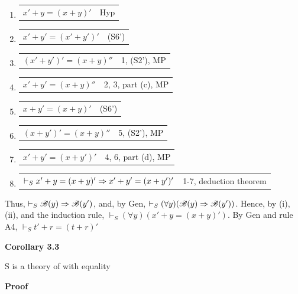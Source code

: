\begin{itemize}
\begin{enumerate} [label=\roman*.]
\begin{enumerate} [label=\arabic*.]
                \item \begin{tabular}{p{8cm} r}
                $x'+y=(x+y)'$ & Hyp
                \end{tabular}
                \item \begin{tabular}{p{8cm} r}
                $x'+y'=(x'+y')'$ & (S6')
                \end{tabular}
                \item \begin{tabular}{p{8cm} r}
                $(x'+y')'=(x+y)''$ & 1, (S2'), MP
                \end{tabular}
                \item \begin{tabular}{p{8cm} r}
                $x'+y'=(x+y)''$ & 2, 3, part (c), MP
                \end{tabular}
                \item \begin{tabular}{p{8cm} r}
                $x+y'=(x+y)'$ & (S6')
                \end{tabular}
                \item \begin{tabular}{p{8cm} r}
                $(x+y')'=(x+y)''$ & 5, (S2'), MP
                \end{tabular}
                \item \begin{tabular}{p{8cm} r}
                $x'+y'=(x+y')'$ & 4, 6, part (d), MP
                \end{tabular}
                \item \begin{tabular}{p{8cm} r}
                $\vdash_S x'+y=(x+y)' \Rightarrow x'+y'=(x+y')'$ & 1-7, deduction theorem
                \end{tabular}
            \end{enumerate}
            Thus, $\vdash_S \mathscr{B}(y) \Rightarrow \mathscr{B}(y')$, and, by Gen, $\vdash_S(\forall y)(\mathscr{B}(y) \Rightarrow \mathscr{B}(y'))$. Hence, by (i), (ii), and the induction rule, $\vdash_S (\forall y) (x'+y= (x+y)')$. By Gen and rule A4, $\vdash_S t'+r=(t+r)'$
        \end{enumerate}
\end{itemize}

\textbf{Corollary 3.3}

S is a theory of with equality

\textbf{Proof}

